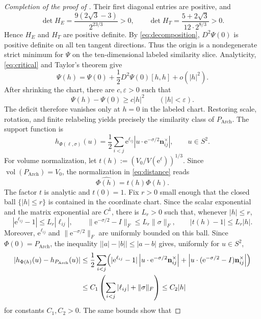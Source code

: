 \documentclass[10pt,a4paper]{amsart}
\newcommand{\Arch}{P_{\mathrm{Arch}}}
\newcommand{\e}{\mathrm e}
\newcommand{\mb}[1]{\mathbf{#1}}
\newcommand{\vol}{\operatorname{vol}}
\begin{document}
\begin{proof}[Completion of the proof of ]
Their first diagonal entries are positive, and
\[
 \det H_E=\frac{9(2\sqrt3-3)}{2^{23/3}}>0,\qquad
 \det H_T=\frac{5+2\sqrt3}{12\cdot 2^{8/3}}>0.
\]
Hence $H_E$ and $H_T$ are positive definite.  By \eqref{eq:decomposition},
$D^2\Psi(0)$ is positive definite on all ten tangent directions.  Thus the
origin is a nondegenerate strict minimum for $\Psi$ on the ten-dimensional labeled
similarity slice.
Analyticity, \eqref{eq:critical} and Taylor's theorem give
\[
 \Psi(h)=\Psi(0)+\frac12D^2\Psi(0)[h,h]+o(|h|^2).
\]
After shrinking the chart, there are $c,\varepsilon>0$ such that
\begin{equation}\label{eq:chart-gap}
 \Psi(h)-\Psi(0)\geq c|h|^2
 \qquad(|h|<\varepsilon).
\end{equation}
The deficit therefore vanishes only at $h=0$ in the labeled chart.  Restoring scale, rotation, and finite relabeling yields precisely the similarity class of $\Arch$.
The support function is
\begin{equation}\label{eq:support}
 h_{\Phi(\ell,\sigma)}(u)=\frac12\sum_{i<j}\e^{\ell_{ij}}
 \left|u\cdot \e^{-\sigma/2}\mb n_{ij}^{\times}\right|,
 \qquad u\in S^2.
\end{equation}
For volume normalization, let
$t(h):=(V_0/V(\e^\ell))^{1/3}$.  Since $\vol(\Arch)=V_0$, the normalization in
\eqref{eq:distance} reads $$\widehat{\Phi(h)}=t(h)\Phi(h).$$
The factor $t$ is analytic and $t(0)=1$.  Fix $r>0$ small enough that
the closed ball $\{|h|\leq r\}$ is contained in the coordinate chart.
Since the scalar exponential and the matrix exponential
are $C^1$,
there is $L_r>0$ such that, whenever $|h|\leq r$,
\[
 |\e^{\ell_{ij}}-1|\leq L_r|\ell_{ij}|,\qquad
 \|\e^{-\sigma/2}-I\|_F\leq L_r\|\sigma\|_F,\qquad
 |t(h)-1|\leq L_r|h|.
\]
Moreover, $\e^{\ell_{ij}}$ and $\|\e^{-\sigma/2}\|_F$ are uniformly
bounded on this ball.  Since $\Phi(0)=\Arch$, the inequality
$\bigl||a|-|b|\bigr|\leq|a-b|$ gives, uniformly for $u\in S^2$,
\[
\begin{aligned}
 |h_{\Phi(h)}(u)-h_{\Arch}(u)|
 &\leq \frac12\sum_{i<j}
 \Bigl(
  |\e^{\ell_{ij}}-1|
  \left|u\cdot\e^{-\sigma/2}\mb n_{ij}^{\times}\right|
  +
  \left|u\cdot
  (\e^{-\sigma/2}-I)\mb n_{ij}^{\times}\right|
 \Bigr)                                                     \\
 &\leq C_1\left(\sum_{i<j}|\ell_{ij}|+\|\sigma\|_F\right)
 \leq C_2|h|
\end{aligned}
\]
for constants $C_1,C_2>0$.  The same bounds show that

\end{proof}
\end{document}
